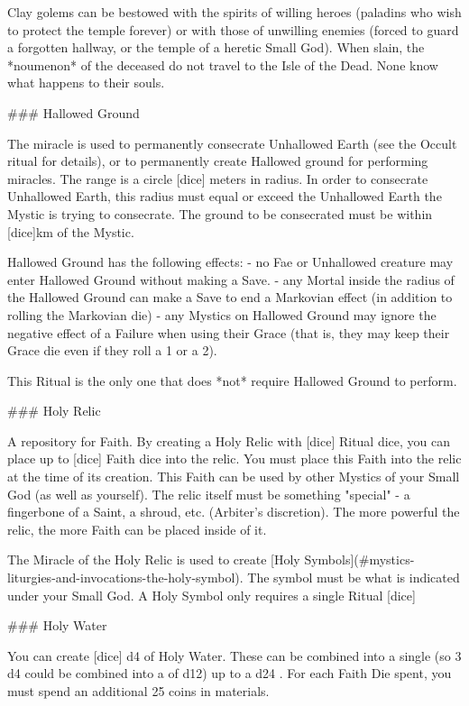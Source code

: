 Clay golems can be bestowed with the spirits of willing heroes (paladins who wish to protect the temple forever) or with those of unwilling enemies (forced to guard a forgotten hallway, or the temple of a heretic Small God).  When slain, the *noumenon* of the deceased do not travel to the Isle of the Dead.  None know what happens to their souls. 


### Hallowed Ground

The miracle is used to permanently consecrate Unhallowed Earth (see the Occult ritual for details), or to permanently create Hallowed ground for performing miracles.  The range is a circle [dice] meters in radius.  In order to consecrate Unhallowed Earth, this radius must equal or exceed the Unhallowed Earth the Mystic is trying to consecrate.  The ground to be consecrated must be within [dice]km of the Mystic.



Hallowed Ground has the following effects:
- no Fae or Unhallowed creature may enter Hallowed Ground without making a Save.
- any Mortal inside the radius of the Hallowed Ground can make a Save to end a Markovian effect (in addition to rolling the Markovian die)
- any Mystics on Hallowed Ground may ignore the negative effect of a Failure when using  their Grace (that is, they may keep their Grace die even if they roll a 1 or a 2).

This Ritual is the only one that does *not* require Hallowed Ground to perform.


### Holy Relic

A repository for Faith.  By creating a Holy Relic with [dice] Ritual dice, you can place up to [dice] Faith dice into the relic.  You must place this Faith into the relic at the time of its creation.  This Faith can be used by other Mystics of your Small God (as well as yourself).  The relic itself must be something "special" - a fingerbone of a Saint, a shroud, etc.  (Arbiter's discretion).  The more powerful the relic, the more Faith can be placed inside of it.

The Miracle of the Holy Relic is used to create [Holy Symbols](#mystics-liturgies-and-invocations-the-holy-symbol).  The symbol must be what is indicated under your Small God.  A Holy Symbol only requires a single Ritual [dice]


### Holy Water

You can create [dice] d4 \UD of Holy Water.  These \UD can be combined into a single \UD (so 3 d4 \UD could be combined into a \UD of d12) up to a d24 \UD.  For each Faith Die spent, you must spend an additional 25 coins in materials.

